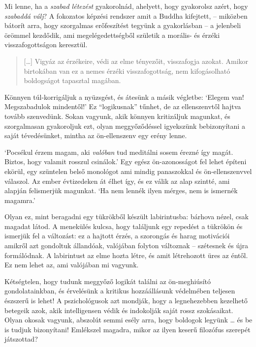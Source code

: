 Mi lenne, ha a \emph{szabad létezést} gyakorolnád, ahelyett, hogy
gyakorolsz azért, hogy \emph{szabaddá válj}? A fokozatos képzési
rendszer amit a Buddha kifejtett, -- miközben bátorít arra, hogy
szorgalmas erőfeszítést tegyünk a gyakorlásban -- a jelenbeli örömmel
kezdődik, ami megelégedettségből születik a morális- és érzéki
visszafogottságon keresztül.

\begin{quote}
{[}\ldots{]} Vigyáz az érzékeire, védi az elme tényezőit, visszafogja
azokat. Amikor birtokában van ez a nemes érzéki visszafogottság, nem
kifogásolható boldogságot tapasztal magában.

\bigskip

\end{quote}


Könnyen túl-korrigáljuk a nyüzsgést, és átesünk a másik végletbe:
`Elegem van! Megszabadulok mindentől!' Ez ``logikusnak'' tűnhet, de az
ellenszenvtől hajtva tovább szenvedünk. Sokan vagyunk, akik könnyen
kritizáljuk magunkat, és szorgalmasan gyakoroljuk ezt, olyan
meggyőződéssel igyekszünk bebizonyítani a saját tévedésünket, mintha az
ön-ellenszenv egy erény lenne.

`Pocsékul érzem magam, aki \emph{valóban} tud meditálni sosem érezné így
magát. Biztos, hogy valamit rosszul csinálok.' Egy egész ön-azonosságot
fel lehet építeni ekörül, egy szüntelen belső monológot ami mindig
panaszokkal és ön-ellenszenvvel válaszol. Az ember évtizedeken át élhet
így, és ez válik az alap szintté, ami alapján felismerjük magunkat. `Ha
nem lennék ilyen mérges, nem is ismernék magamra.'

Olyan ez, mint beragadni egy tükrökből készült labirintusba: bárhova
nézel, csak magadat látod. A menekülés kulcsa, hogy találjunk egy
repedést a tükrökön és ismerjük fel a változást: ez a hajtott érzés, a
szorongás és harag motivációi amikről azt gondoltuk állandóak, valójában
folyton változnak -- szétesnek és újra formálódnak. A labirintust az
elme hozta létre, és amit létrehozott üres az éntől. Ez nem lehet az,
ami valójában mi vagyunk.

Kétségtelen, hogy tudunk meggyőző logikát találni az ön-meghiúsító
gondolatainkban, és érvelésünk a kritikus hozzáállásunk védelmében
teljesen észszerű is lehet! A pszichológusok azt mondják, hogy a
legnehezebben kezelhető betegeik azok, akik intelligensen védik és
indokolják saját rossz szokásaikat. Olyan okosak vagyunk, abszolút semmi
esély arra, hogy boldogok legyünk \ldots{} és be is tudjuk bizonyítani!
Emlékszel magadra, mikor az ilyen keserű filozófus szerepét játszottad?

